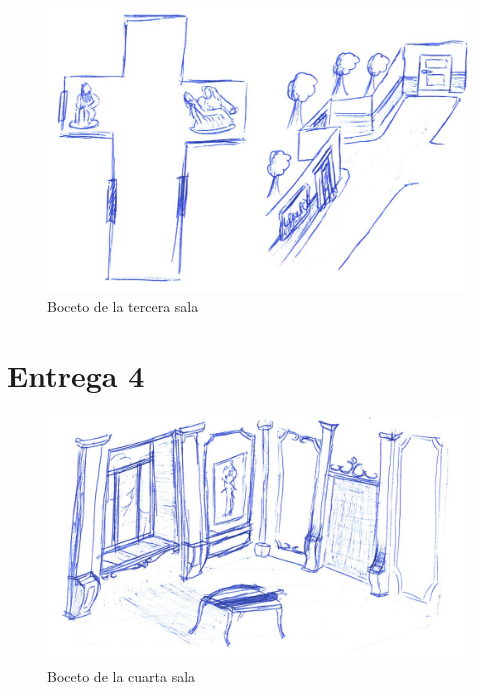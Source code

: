 \begin{figure}[!h]
\begin{center}
\includegraphics[width=1\textwidth]{imagenes/7/bocetos/boceto-sala-3.png}
\caption{Boceto de la tercera sala}
\label{fig:bocetos-salas-3}
\end{center}
\end{figure}

\section{Entrega 4}

\begin{figure}[!h]
\begin{center}
\includegraphics[width=1\textwidth]{imagenes/7/bocetos/boceto-sala-4.png}
\caption{Boceto de la cuarta sala}
\label{fig:bocetos-salas-4}
\end{center}
\end{figure}

